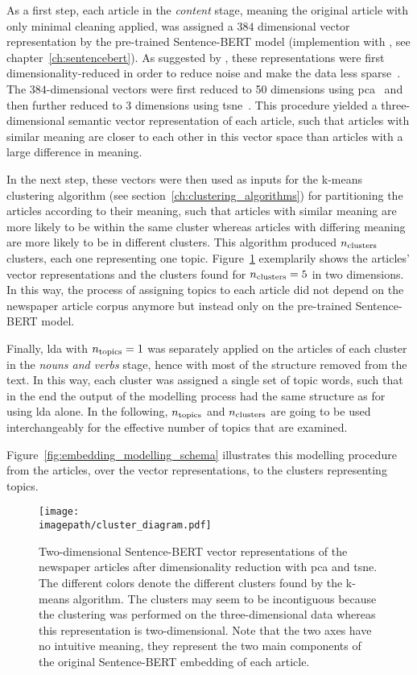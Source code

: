 As a first step, each article in the \textit{content} stage, meaning the original article with only minimal cleaning applied, was assigned a $384$ dimensional vector representation by the pre-trained Sentence-BERT model (implemention with \textcite{sbertsentencetransformers_sentencetransformers_nodate}, see chapter~\ref{ch:sentencebert}). As suggested by \textcite{black_using_2020}, these representations were first dimensionality-reduced in order to reduce noise and make the data less sparse~\autocite{ding_dimension_2009}. The $384$-dimensional vectors were first reduced to \SI{50}{} dimensions using \gls{pca}~\autocite{pearson_liii_1901} and then further reduced to \SI{3}{} dimensions using \gls{tsne}~\autocite{maaten_visualizing_2008}. This procedure yielded a three-dimensional semantic vector representation of each article, such that articles with similar meaning are closer to each other in this vector space than articles with a large difference in meaning.

In the next step, these vectors were then used as inputs for the k-means clustering algorithm (see section~\ref{ch:clustering_algorithms}) for partitioning the articles according to their meaning, such that articles with similar meaning are more likely to be within the same cluster whereas articles with differing meaning are more likely to be in different clusters. This algorithm produced $n_\text{clusters}$ clusters, each one representing one topic. Figure~\ref{fig:clusters} exemplarily shows the articles' vector representations and the clusters found for $n_\text{clusters}=5$ in two dimensions. In this way, the process of assigning topics to each article did not depend on the newspaper article corpus anymore but instead only on the pre-trained Sentence-BERT model.

Finally, \gls{lda} with $n_\text{topics}=1$ was separately applied on the articles of each cluster in the \textit{nouns and verbs} stage, hence with most of the structure removed from the text. In this way, each cluster was assigned a single set of topic words, such that in the end the output of the modelling process had the same structure as for using \gls{lda} alone. In the following, $n_\text{topics}$ and $n_\text{clusters}$ are going to be used interchangeably for the effective number of topics that are examined.

Figure~\ref{fig:embedding_modelling_schema} illustrates this modelling procedure from the articles, over the vector representations, to the clusters representing topics.

\begin{figure}
    \centering
    \texttt{[image: \\imagepath/cluster\_diagram.pdf]}
    \caption{Two-dimensional Sentence-BERT vector representations of the newspaper articles after dimensionality reduction with \gls{pca} and \gls{tsne}. The different colors denote the different clusters found by the k-means algorithm. The clusters may seem to be incontiguous because the clustering was performed on the three-dimensional data whereas this representation is two-dimensional. Note that the two axes have no intuitive meaning, they represent the two main components of the original Sentence-BERT embedding of each article.}\label{fig:clusters}
\end{figure}

